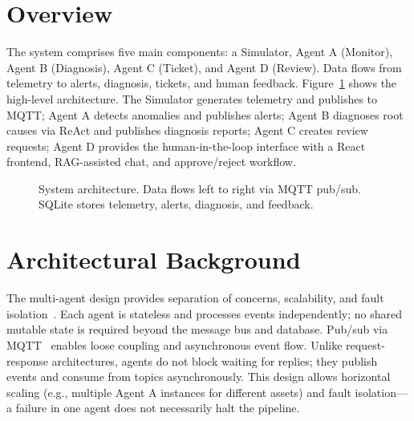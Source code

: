 \documentclass[12pt,letterpaper]{report}
\begin{document}
\section{Overview}

The system comprises five main components: a Simulator, Agent A (Monitor), Agent B (Diagnosis), Agent C (Ticket), and Agent D (Review). Data flows from telemetry to alerts, diagnosis, tickets, and human feedback. Figure~\ref{fig:architecture} shows the high-level architecture. The Simulator generates telemetry and publishes to MQTT; Agent A detects anomalies and publishes alerts; Agent B diagnoses root causes via ReAct and publishes diagnosis reports; Agent C creates review requests; Agent D provides the human-in-the-loop interface with a React frontend, RAG-assisted chat, and approve/reject workflow.

\begin{figure}[htbp]
\centering
{}
\caption{System architecture. Data flows left to right via MQTT pub/sub. SQLite stores telemetry, alerts, diagnosis, and feedback.}
\label{fig:architecture}
\end{figure}

\section{Architectural Background}

The multi-agent design provides separation of concerns, scalability, and fault isolation~\cite{wooldridge2009multiagent}. Each agent is stateless and processes events independently; no shared mutable state is required beyond the message bus and database. Pub/sub via MQTT~\cite{oasis2019mqtt,hussain2021mqtt} enables loose coupling and asynchronous event flow. Unlike request-response architectures, agents do not block waiting for replies; they publish events and consume from topics asynchronously. This design allows horizontal scaling (e.g., multiple Agent A instances for different assets) and fault isolation---a failure in one agent does not necessarily halt the pipeline.
\end{document}
